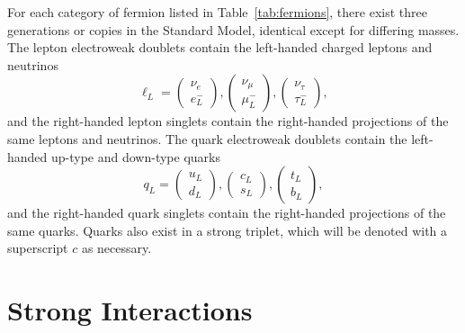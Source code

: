 For each category of fermion listed in Table~\ref{tab:fermions}, there exist three generations or copies in the Standard Model, identical except for differing masses.
The lepton electroweak doublets contain the left-handed charged leptons and neutrinos
\begin{equation}
  \ell_{L} = \begin{pmatrix} \nu_e \\ e^-_L \end{pmatrix} ,
              \begin{pmatrix} \nu_\mu \\ \mu^-_L \end{pmatrix} ,
              \begin{pmatrix} \nu_\tau \\ \tau^-_L \end{pmatrix} ,
\end{equation}
and the right-handed lepton singlets contain the right-handed projections of the same leptons and neutrinos.
The quark electroweak doublets contain the left-handed up-type and down-type quarks
\begin{equation}
  q_{L} = \begin{pmatrix} u_L \\ d_L \end{pmatrix} ,
           \begin{pmatrix} c_L \\ s_L \end{pmatrix} ,
           \begin{pmatrix} t_L \\ b_L \end{pmatrix} ,
\end{equation}
and the right-handed quark singlets contain the right-handed projections of the same quarks.
Quarks also exist in a strong triplet, which will be denoted with a superscript $c$ as necessary.

\section{Strong Interactions}
\label{subsec:qcd}


